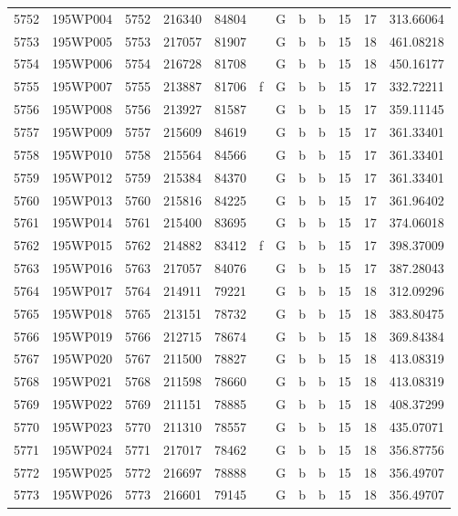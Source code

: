 \begin{tabular}{|*{12}{c|}}
5752 & 195WP004 & 5752 & 216340 & 84804 &  & G & b & b & 15 & 17 & 313.66064 \\ 
5753 & 195WP005 & 5753 & 217057 & 81907 &  & G & b & b & 15 & 18 & 461.08218 \\ 
5754 & 195WP006 & 5754 & 216728 & 81708 &  & G & b & b & 15 & 18 & 450.16177 \\ 
5755 & 195WP007 & 5755 & 213887 & 81706 & f & G & b & b & 15 & 17 & 332.72211 \\ 
5756 & 195WP008 & 5756 & 213927 & 81587 &  & G & b & b & 15 & 17 & 359.11145 \\ 
5757 & 195WP009 & 5757 & 215609 & 84619 &  & G & b & b & 15 & 17 & 361.33401 \\ 
5758 & 195WP010 & 5758 & 215564 & 84566 &  & G & b & b & 15 & 17 & 361.33401 \\ 
5759 & 195WP012 & 5759 & 215384 & 84370 &  & G & b & b & 15 & 17 & 361.33401 \\ 
5760 & 195WP013 & 5760 & 215816 & 84225 &  & G & b & b & 15 & 17 & 361.96402 \\ 
5761 & 195WP014 & 5761 & 215400 & 83695 &  & G & b & b & 15 & 17 & 374.06018 \\ 
5762 & 195WP015 & 5762 & 214882 & 83412 & f & G & b & b & 15 & 17 & 398.37009 \\ 
5763 & 195WP016 & 5763 & 217057 & 84076 &  & G & b & b & 15 & 17 & 387.28043 \\ 
5764 & 195WP017 & 5764 & 214911 & 79221 &  & G & b & b & 15 & 18 & 312.09296 \\ 
5765 & 195WP018 & 5765 & 213151 & 78732 &  & G & b & b & 15 & 18 & 383.80475 \\ 
5766 & 195WP019 & 5766 & 212715 & 78674 &  & G & b & b & 15 & 18 & 369.84384 \\ 
5767 & 195WP020 & 5767 & 211500 & 78827 &  & G & b & b & 15 & 18 & 413.08319 \\ 
5768 & 195WP021 & 5768 & 211598 & 78660 &  & G & b & b & 15 & 18 & 413.08319 \\ 
5769 & 195WP022 & 5769 & 211151 & 78885 &  & G & b & b & 15 & 18 & 408.37299 \\ 
5770 & 195WP023 & 5770 & 211310 & 78557 &  & G & b & b & 15 & 18 & 435.07071 \\ 
5771 & 195WP024 & 5771 & 217017 & 78462 &  & G & b & b & 15 & 18 & 356.87756 \\ 
5772 & 195WP025 & 5772 & 216697 & 78888 &  & G & b & b & 15 & 18 & 356.49707 \\ 
5773 & 195WP026 & 5773 & 216601 & 79145 &  & G & b & b & 15 & 18 & 356.49707 \\ 

\end{tabular}
